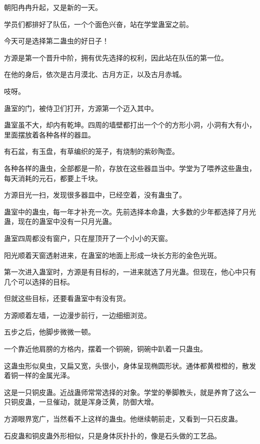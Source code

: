 
\begin{this_body}



朝阳冉冉升起，又是新的一天。

学员们都排好了队伍，一个个面色兴奋，站在学堂蛊室之前。

今天可是选择第二蛊虫的好日子！

方源是第一个晋升中阶，拥有优先选择的权利，因此站在队伍的第一位。

在他的身后，依次是古月漠北、古月方正，以及古月赤城。

吱呀。

蛊室的门，被侍卫们打开，方源第一个迈入其中。

蛊室虽不大，却内有乾坤。四周的墙壁都打出一个个的方形小洞，小洞有大有小，里面摆放着各种各样的器皿。

有石盆，有玉盘，有草编织的笼子，有烧制的紫砂陶壶。

各种各样的蛊虫，全部都是一阶，存放在这些器皿当中。学堂为了喂养这些蛊虫，每天消耗的元石，都要上千块。

方源目光一扫，发现很多器皿中，已经空着，没有蛊虫了。

蛊室中的蛊虫，每一年才补充一次。先前选择本命蛊，大多数的少年都选择了月光蛊，现在的蛊室中没有一只月光蛊。

蛊室四周都没有窗户，只在屋顶开了一个小小的天窗。

阳光顺着天窗透射进来，在蛊室的地面上形成一块长方形的金色光斑。

第一次进入蛊室时，方源是有目标的，一进来就选了月光蛊。但现在，他心中只有几个可以选择的目标。

但就这些目标，还要看蛊室中有没有货。

方源顺着左墙，一边漫步前行，一边细细浏览。

五步之后，他脚步微微一顿。

一个靠近他肩膀的方格内，摆着一个铜碗，铜碗中趴着一只蛊虫。

这蛊虫形似臭虫，又扁又宽，头很小，身体呈现椭圆形状。通体都黄橙橙的，散发着铜一样的金属光泽。

这是一只铜皮蛊。近战蛊师常常选择的对象。学堂的拳脚教头，就是养育了这么一只铜皮蛊，一旦催动，就是浑身泛黄，防御大增。

方源眼界宽广，当然看不上这样的蛊虫。他继续朝前走，又看到一只石皮蛊。

石皮蛊和铜皮蛊外形相似，只是身体灰扑扑的，像是石头做的工艺品。


\end{this_body}
